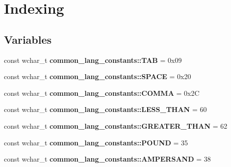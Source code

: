 \hypertarget{group___indexing}{\section{Indexing}
\label{group___indexing}
}
\subsection*{Variables}
\begin{DoxyCompactItemize}
\item 
\hypertarget{group___indexing_gaf1567d953c44dcd03a14f43827477be8}{const wchar\-\_\-t {\bfseries common\-\_\-lang\-\_\-constants\-::\-T\-A\-B} = 0x09}\label{group___indexing_gaf1567d953c44dcd03a14f43827477be8}

\item 
\hypertarget{group___indexing_ga47139b6aa42cfef8c2adf07c47659017}{const wchar\-\_\-t {\bfseries common\-\_\-lang\-\_\-constants\-::\-S\-P\-A\-C\-E} = 0x20}\label{group___indexing_ga47139b6aa42cfef8c2adf07c47659017}

\item 
\hypertarget{group___indexing_gaefa1fb1db54f9abd12e543e39caf6aaa}{const wchar\-\_\-t {\bfseries common\-\_\-lang\-\_\-constants\-::\-C\-O\-M\-M\-A} = 0x2\-C}\label{group___indexing_gaefa1fb1db54f9abd12e543e39caf6aaa}

\item 
\hypertarget{group___indexing_gadbbafdd578a275153afd758397e18989}{const wchar\-\_\-t {\bfseries common\-\_\-lang\-\_\-constants\-::\-L\-E\-S\-S\-\_\-\-T\-H\-A\-N} = 60}\label{group___indexing_gadbbafdd578a275153afd758397e18989}

\item 
\hypertarget{group___indexing_ga4d90459a552ad55c759c9bffeea4fb34}{const wchar\-\_\-t {\bfseries common\-\_\-lang\-\_\-constants\-::\-G\-R\-E\-A\-T\-E\-R\-\_\-\-T\-H\-A\-N} = 62}\label{group___indexing_ga4d90459a552ad55c759c9bffeea4fb34}

\item 
\hypertarget{group___indexing_ga463d10992480f4ab48b25f495a4337f1}{const wchar\-\_\-t {\bfseries common\-\_\-lang\-\_\-constants\-::\-P\-O\-U\-N\-D} = 35}\label{group___indexing_ga463d10992480f4ab48b25f495a4337f1}

\item 
\hypertarget{group___indexing_ga15d395567241eb3f1cb9ec43c1e71206}{const wchar\-\_\-t {\bfseries common\-\_\-lang\-\_\-constants\-::\-A\-M\-P\-E\-R\-S\-A\-N\-D} = 38}\label{group___indexing_ga15d395567241eb3f1cb9ec43c1e71206}


\end{DoxyCompactItemize}
